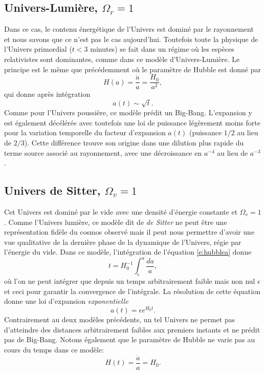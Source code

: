 \subsection{Univers-Lumière, $\Omega_r=1$ }
Dans ce cas, le contenu énergétique de l'Univers est dominé par le rayonnement et nous savons que ce n'est pas le cas aujourd'hui. Toutefois toute la physique de l'Univers primordial ($t<3$ minutes) se fait dans un régime où les espèces relativistes sont dominantes, comme dans ce modèle d'Univers-Lumière. Le principe est le même que précédemment où le paramètre de Hubble est donné par 
\begin{equation}
H(a)=\frac{\dot a}{a}=\frac{H_0}{a^2},
\end{equation} 
qui donne après intégration
\begin{equation}
a(t)\sim\sqrt{t}.
\end{equation}
Comme pour l'Univers poussière, ce modèle prédit un Big-Bang. L'expansion y est également décélérée avec toutefois une loi de puissance légèrement moins forte pour la variation temporelle du facteur d'expansion $a(t)$ (puissance $1/2$ au lieu de $2/3$). Cette différence trouve son origine dans une dilution plus rapide du terme source associé au rayonnement, avec une décroissance en $a^{-4}$ au lieu de $a^{-3}$.

\subsection{Univers de Sitter, $\Omega_v=1$}
Cet Univers est dominé par le vide avec une densité d'énergie constante et $\Omega_v=1$. Comme l'Univers lumière, ce modèle dit de \textit{de Sitter} ne peut être une représentation fidèle du cosmos observé mais il peut nous permettre d'avoir une vue qualitative de la dernière phase de la dynamique de l'Univers, régie par l'énergie du vide. Dans ce modèle, l'intégration de l'équation \ref{e:hubblea} donne 
\begin{equation}
t=H_0^{-1}\int_\epsilon^a\frac{da}{a},
\end{equation}
où l'on ne peut intégrer que depuis un temps arbitrairement faible mais non nul $\epsilon$ et ceci pour garantir la convergence de l'intégrale. La résolution de cette équation donne une loi d'expansion \textit{exponentielle}
\begin{equation}
a(t)=\epsilon e^{H_0 t}.
\end{equation}
Contrairement au deux modèles précédents, un tel Univers ne permet pas d'atteindre des distances arbitrairement faibles aux premiers instants et ne prédit pas de Big-Bang. Notons également que le paramètre de Hubble ne varie pas au cours du temps dans ce modèle:
\begin{equation}
H(t)=\frac{\dot a}{a}=H_0.
\end{equation}

